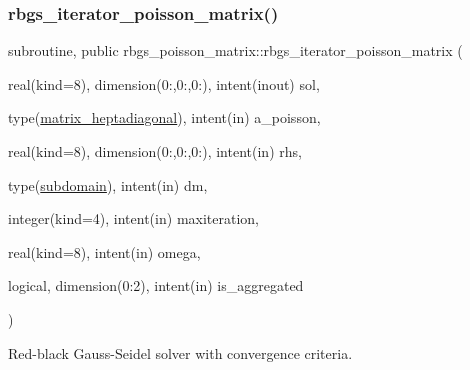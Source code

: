 \subsubsection{\texorpdfstring{rbgs\+\_\+iterator\+\_\+poisson\+\_\+matrix()}{rbgs\_iterator\_poisson\_matrix()}}
{\footnotesize\ttfamily subroutine, public rbgs\+\_\+poisson\+\_\+matrix\+::rbgs\+\_\+iterator\+\_\+poisson\+\_\+matrix (\begin{DoxyParamCaption}\item[{real(kind=8), dimension(0\+:,0\+:,0\+:), intent(inout)}]{sol,  }\item[{type(\hyperlink{structmatrix_1_1matrix__heptadiagonal}{matrix\+\_\+heptadiagonal}), intent(in)}]{a\+\_\+poisson,  }\item[{real(kind=8), dimension(0\+:,0\+:,0\+:), intent(in)}]{rhs,  }\item[{type(\hyperlink{structgeometry_1_1subdomain}{subdomain}), intent(in)}]{dm,  }\item[{integer(kind=4), intent(in)}]{maxiteration,  }\item[{real(kind=8), intent(in)}]{omega,  }\item[{logical, dimension(0\+:2), intent(in)}]{is\+\_\+aggregated }\end{DoxyParamCaption})}



Red-\/black Gauss-\/\+Seidel solver with convergence criteria. 


